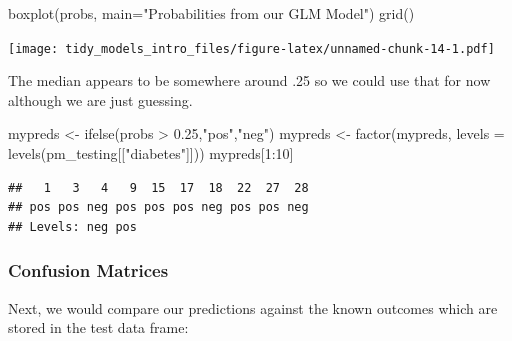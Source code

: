 \documentclass[
]{article}
\newenvironment{Shaded}{\begin{snugshade}}{\end{snugshade}}
\newcommand{\AttributeTok}[1]{\textcolor[rgb]{0.77,0.63,0.00}{#1}}
\newcommand{\CommentTok}[1]{\textcolor[rgb]{0.56,0.35,0.01}{\textit{#1}}}
\newcommand{\DecValTok}[1]{\textcolor[rgb]{0.00,0.00,0.81}{#1}}
\newcommand{\FloatTok}[1]{\textcolor[rgb]{0.00,0.00,0.81}{#1}}
\newcommand{\FunctionTok}[1]{\textcolor[rgb]{0.00,0.00,0.00}{#1}}
\newcommand{\NormalTok}[1]{#1}
\newcommand{\OtherTok}[1]{\textcolor[rgb]{0.56,0.35,0.01}{#1}}
\newcommand{\SpecialCharTok}[1]{\textcolor[rgb]{0.00,0.00,0.00}{#1}}
\newcommand{\StringTok}[1]{\textcolor[rgb]{0.31,0.60,0.02}{#1}}
\begin{document}
\begin{Shaded}
\begin{Highlighting}[]
\FunctionTok{boxplot}\NormalTok{(probs, }
        \AttributeTok{main=}\StringTok{"Probabilities from our GLM Model"}\NormalTok{)}
\FunctionTok{grid}\NormalTok{()}
\end{Highlighting}
\end{Shaded}

\texttt{[image: tidy\_models\_intro\_files/figure-latex/unnamed-chunk-14-1.pdf]}

The median appears to be somewhere around .25 so we could use that for
now although we are just guessing.

\begin{Shaded}
\begin{Highlighting}[]
\NormalTok{mypreds }\OtherTok{\textless{}{-}} \FunctionTok{ifelse}\NormalTok{(probs }\SpecialCharTok{\textgreater{}} \FloatTok{0.25}\NormalTok{,}\StringTok{"pos"}\NormalTok{,}\StringTok{"neg"}\NormalTok{)}
\NormalTok{mypreds }\OtherTok{\textless{}{-}} \FunctionTok{factor}\NormalTok{(mypreds, }\AttributeTok{levels =} \FunctionTok{levels}\NormalTok{(pm\_testing[[}\StringTok{"diabetes"}\NormalTok{]]))}
\NormalTok{mypreds[}\DecValTok{1}\SpecialCharTok{:}\DecValTok{10}\NormalTok{]}
\end{Highlighting}
\end{Shaded}

\begin{verbatim}
##   1   3   4   9  15  17  18  22  27  28 
## pos pos neg pos pos pos neg pos pos neg 
## Levels: neg pos
\end{verbatim}

\hypertarget{confusion-matrices}{%
\subsubsection{Confusion Matrices}\label{confusion-matrices}}

Next, we would compare our predictions against the known outcomes which
are stored in the test data frame:

\begin{Shaded}
\end{Shaded}
\end{document}
